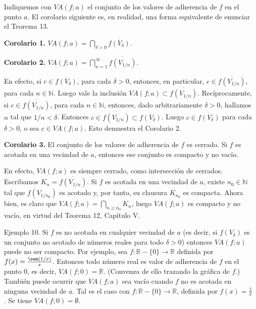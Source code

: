 \documentclass[12pt,oneside]{book}
\begin{document}
Indiquemos con \( VA(f; a) \) el conjunto de los valores de adherencia de \( f \) en el punto \( a \). El corolario siguiente es, en realidad, una forma equivalente de enunciar el Teorema 13.

\textbf{Corolario 1.} \( VA(f; a) = \bigcap_{\delta > 0} \overline{f(V_\delta)} \).

\textbf{Corolario 2.} \( VA(f; a) = \bigcap_{n=1}^{\infty} \overline{f(V_{1/n})} \).

En efecto, si \( c \in \overline{f(V_\delta)} \), para cada \( \delta > 0 \), entonces, en particular, \( c \in \overline{f(V_{1/n})} \), para cada \( n \in \mathbb{N} \). Luego vale la inclusión \( VA(f; a) \subset \overline{f(V_{1/n})} \). Recíprocamente, si \( c \in \overline{f(V_{1/n})} \), para cada \( n \in \mathbb{N} \), entonces, dado arbitrariamente \( \delta > 0 \), hallamos \( n \) tal que \( 1/n < \delta \). Entonces \( c \in \overline{f(V_{1/n})} \subset \overline{f(V_\delta)} \). Luego \( c \in \overline{f(V_\delta)} \) para cada \( \delta > 0 \), o sea \( c \in VA(f; a) \). Esto demuestra el Corolario 2.

\textbf{Corolario 3.} El conjunto de los valores de adherencia de \( f \) es cerrado. Si \( f \) es acotada en una vecindad de \( a \), entonces ese conjunto es compacto y no vacío.

En efecto, \( VA(f; a) \) es siempre cerrado, como intersección de cerrados. Escribamos \( K_n = \overline{f(V_{1/n})} \). Si \( f \) es acotada en una vecindad de \( a \), existe \( n_0 \in \mathbb{N} \) tal que \( f(V_{1/n_0}) \) es acotado y, por tanto, su clausura \( K_{n_0} \) es compacta. Ahora bien, es claro que \( VA(f; a) = \bigcap_{n \geq n_0} K_n \), luego \( VA(f; a) \) es compacto y no vacío, en virtud del Teorema 12, Capítulo V.

Ejemplo 10. Si \( f \) es no acotada en cualquier vecindad de \( a \) (es decir, si \( f(V_\delta) \) es un conjunto no acotado de números reales para todo \( \delta > 0 \)) entonces \( VA(f; a) \) puede no ser compacto. Por ejemplo, sea \( f: \mathbb{R} - \{0\} \to \mathbb{R} \) definida por \( f(x) = \frac{\sen(1/x)}{x} \). Entonces todo número real es valor de adherencia de \( f \) en el punto \( 0 \), es decir, \( VA(f; 0) = \mathbb{R} \). (Convenza de ello trazando la gráfica de \( f \).) También puede ocurrir que \( VA(f; a) \) sea vacío cuando \( f \) no es acotada en ninguna vecindad de \( a \). Tal es el caso con \( f: \mathbb{R} - \{0\} \to \mathbb{R} \), definida por \( f(x) = \frac{1}{x} \). Se tiene \( VA(f; 0) = \emptyset \).
\end{document}
